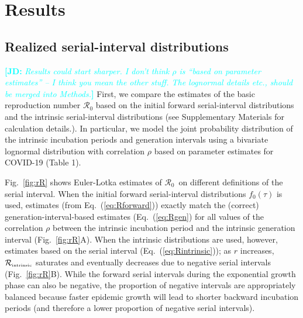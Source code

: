 \documentclass[12pt]{article}
\newcommand{\comment}{\showcomment}
\newcommand{\showcomment}[3]{\textcolor{#1}{\textbf{[#2: }\textsl{#3}\textbf{]}}}
\newcommand{\jd}[1]{\comment{cyan}{JD}{#1}}
\newcommand{\eref}[1]{Eq.~(\ref{eq:#1})}
\newcommand{\fref}[1]{Fig.~\ref{fig:#1}}
\newcommand{\Rx}[1]{\ensuremath{{\mathcal R}_{#1}}\xspace}
\newcommand{\Ro}{\Rx{0}}
\newcommand{\Rintrinsic}{\ensuremath{{\mathcal R}_{\textrm{\tiny intrinsic}}}\xspace}
\begin{document}
\section{Results}

\subsection{Realized serial-interval distributions}

\jd{Results could start sharper. I don't think $\rho$ is ``based on parameter estimates'' --  I think you mean the other stuff. The lognormal details etc., should be merged into Methods.}
First, we compare the estimates of the basic reproduction number \Ro based on the initial forward serial-interval distributions and the intrinsic serial-interval distributions (see Supplementary Materials for calculation details.).
In particular, we model the joint probability distribution of the intrinsic incubation periods and generation intervals using a bivariate lognormal distribution with correlation $\rho$ based on parameter estimates for COVID-19 (Table 1).

\fref{rR} shows Euler-Lotka estimates of \Ro\ on different definitions of the serial interval. 
When the initial forward serial-interval distributions $f_0(\tau)$ is used, estimates (from \eref{Rforward}) exactly match the (correct) generation-interval-based estimates (\eref{Rgen} for all values of the correlation $\rho$ between the intrinsic incubation period and the intrinsic generation interval (\fref{rR}A).
When the intrinsic distributions are used, however, estimates based on the serial interval (\eref{Rintrinsic});
as $r$ increases, \Rintrinsic saturates and eventually decreases due to negative serial intervals (\fref{rR}B).
While the forward serial intervals during the exponential growth phase can also be negative, the proportion of negative intervals are appropriately balanced because faster epidemic growth will lead to shorter backward incubation periods (and therefore a lower proportion of negative serial intervals).
\end{document}
